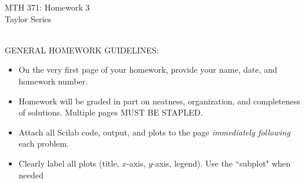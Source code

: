 \documentclass[addpoints, 11pt]{exam}
\begin{document}
\vspace{100mm}
\begin{center} \Large
MTH 371: Homework 3 \\ Taylor Series \normalsize
\end{center}
\ \\
\noindent GENERAL HOMEWORK GUIDELINES: 
\begin{itemize}
\item On the very first page of your homework, provide your name, date, and homework number.\vspace{-2mm}
\item Homework will be graded in part on neatness, organization, and completeness of solutions. Multiple pages MUST BE STAPLED. \vspace{-2mm}
\item Attach all Scilab code, output, and plots to the page \emph{immediately following} each problem. \vspace{-2mm}
\item Clearly label all plots (title, $x$-axis, $y$-axis, legend). Use the ``subplot" when needed
\end{itemize}
\end{document}
